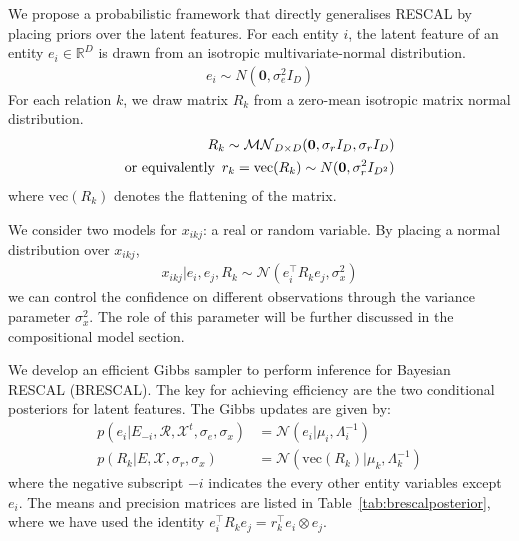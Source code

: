 We propose a probabilistic framework that directly generalises RESCAL
by placing priors over the
latent features. For each entity $i$, the latent feature of an entity $e_i \in
\mathbb{R}^{D}$ is drawn from an isotropic multivariate-normal distribution.
\begin{align}
\label{eqn:entity_gen}
e_i \sim {N}(\mathbf{0}, \sigma_e^2{I}_D)
\end{align}
For each relation $k$, we draw matrix $R_k$ from
a zero-mean isotropic matrix normal distribution.
\begin{align}
\label{eqn:relation_gen}
R_k \sim \mathcal{MN}_{D \times D}(\mathbf{0}, \sigma_r{I}_D, \sigma_r{I}_D) \\
\text{or equivalently}\enspace r_k  = \text{vec}(R_k) \sim N(\mathbf{0}, \sigma_r^2 I_{D^2}) \notag
\end{align}
where $\text{vec}(R_k)$ denotes the flattening of the matrix.

We consider two models for $x_{ikj}$: a real or random variable. By placing a
normal distribution over $x_{ikj}$,
\begin{align}
  x_{ikj} |e_i, e_j, R_k \sim \mathcal{N}(e_i^{\top} R_k e_j, \sigma_x^2) \label{eqn:triple_gen}
\end{align}
we can control the confidence on different observations
through the variance parameter $\sigma_x^2$.
The role of this parameter will be further discussed in the compositional model section.

We develop an efficient Gibbs sampler to perform inference for Bayesian RESCAL (BRESCAL).
The key for achieving efficiency are the two conditional posteriors for latent features.
The Gibbs updates are given by:
\begin{align}
p(e_i |E_{-i}, \mathcal{R}, \mathcal{X}^{t}, \sigma_e, \sigma_x) &= \mathcal{N}(e_i | \mu_i,
\Lambda_i^{-1})  \label{eqn:sample_e} \\
p(R_k|E, \mathcal{X}, \sigma_r, \sigma_x) &= \mathcal{N}(\text{vec}(R_k) |
\mu_k, \Lambda_k^{-1}) \label{eqn:sample_r}
\end{align}
where the negative subscript $-i$ indicates the every other entity variables except $e_i$.
The means and precision matrices are listed in Table~\ref{tab:brescalposterior}, where we have
used the identity $e_i^{\top} R_k e_j = r_k^{\top} e_i \otimes e_j$.

